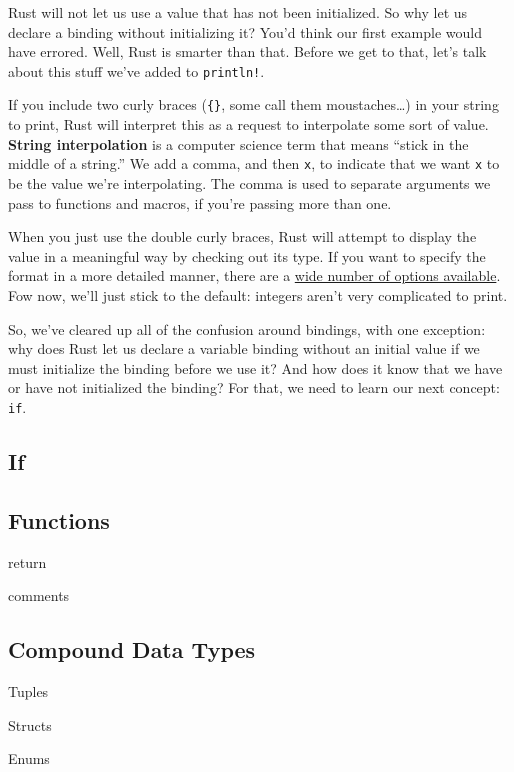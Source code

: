 \documentclass[]{article}
\begin{document}
Rust will not let us use a value that has not been initialized. So why
let us declare a binding without initializing it? You'd think our first
example would have errored. Well, Rust is smarter than that. Before we
get to that, let's talk about this stuff we've added to
\texttt{println!}.

If you include two curly braces (\texttt{\{\}}, some call them
moustaches\ldots{}) in your string to print, Rust will interpret this as
a request to interpolate some sort of value. \textbf{String
interpolation} is a computer science term that means ``stick in the
middle of a string.'' We add a comma, and then \texttt{x}, to indicate
that we want \texttt{x} to be the value we're interpolating. The comma
is used to separate arguments we pass to functions and macros, if you're
passing more than one.

When you just use the double curly braces, Rust will attempt to display
the value in a meaningful way by checking out its type. If you want to
specify the format in a more detailed manner, there are a
\href{/std/fmt/index.html}{wide number of options available}. Fow now,
we'll just stick to the default: integers aren't very complicated to
print.

So, we've cleared up all of the confusion around bindings, with one
exception: why does Rust let us declare a variable binding without an
initial value if we must initialize the binding before we use it? And
how does it know that we have or have not initialized the binding? For
that, we need to learn our next concept: \texttt{if}.

\subsection{If}\label{if}

\subsection{Functions}\label{functions}

return

comments

\subsection{Compound Data Types}\label{compound-data-types}

Tuples

Structs

Enums
\end{document}

